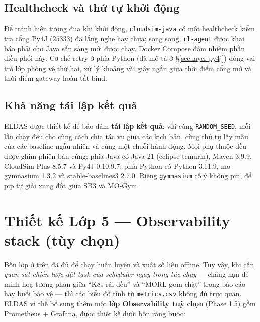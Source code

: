 \subsection{Healthcheck và thứ tự khởi động}
Để tránh hiện tượng đua khi khởi động, \texttt{cloudsim-java} có một
healthcheck kiểm tra cổng Py4J ($25333$) đã lắng nghe hay chưa;
song song, \texttt{rl-agent} được khai báo phải chờ Java sẵn sàng
mới được chạy. Docker Compose đảm nhiệm phần điều phối này. Cơ chế
retry ở phía Python (đã mô tả ở §\ref{sec:layer-py4j}) đóng vai trò
lớp phòng vệ thứ hai, xử lý khoảng vài giây ngắn giữa thời điểm cổng
mở và thời điểm gateway hoàn tất bind.

\subsection{Khả năng tái lập kết quả}
ELDAS được thiết kế để bảo đảm \textbf{tái lập kết quả}: với cùng
\texttt{RANDOM\_SEED}, mỗi lần chạy đều cho cùng cách chia tác vụ
giữa các kịch bản, cùng thứ tự lấy mẫu của các baseline ngẫu nhiên
và cùng một chuỗi hành động. Mọi phụ thuộc đều được ghim phiên bản
cứng: phía Java có Java 21 (eclipse-temurin), Maven 3.9.9, CloudSim
Plus 8.5.7 và Py4J 0.10.9.7; phía Python có Python 3.11.9,
mo-gymnasium 1.3.2 và stable-baselines3 2.7.0. Riêng
\texttt{gymnasium} cố ý không pin, để pip tự giải xung đột giữa SB3
và MO-Gym.

\section{Thiết kế Lớp 5 — Observability stack (tùy chọn)}
\label{sec:layer-observability}

Bốn lớp ở trên đã đủ để chạy huấn luyện và xuất số liệu offline. Tuy
vậy, khi cần \emph{quan sát chiến lược đặt task của scheduler ngay
trong lúc chạy} --- chẳng hạn để minh hoạ tương phản giữa ``K8s rải
đều'' và ``MORL gom chặt'' trong báo cáo hay buổi bảo vệ --- thì các
biểu đồ tĩnh từ \texttt{metrics.csv} không đủ trực quan. ELDAS vì thế
bổ sung thêm một \textbf{lớp Observability tuỳ chọn} (Phase 1.5) gồm
Prometheus + Grafana, được thiết kế dưới bốn ràng buộc:

